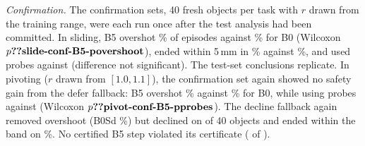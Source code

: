 \emph{Confirmation.} The confirmation sets, 40 fresh objects per task with $r$ drawn from the training range, were each run once after the test analysis had been committed. In sliding, B5 overshot \% of episodes against \% for B0 (Wilcoxon $p\N{slide-conf-B5-povershoot}$), ended within 5\,mm in \% against \%, and used  probes against  (difference not significant). The test-set conclusions replicate.
In pivoting ($r$ drawn from $[1.0,1.1]$), the confirmation set again showed no safety gain from the defer fallback: B5 overshot \% against \% for B0, while using  probes against  (Wilcoxon $p\N{pivot-conf-B5-pprobes}$). The decline fallback again removed overshoot (B0Sd \%) but declined on  of 40 objects and ended within the band on \%. No certified B5 step violated its certificate ( of ).
